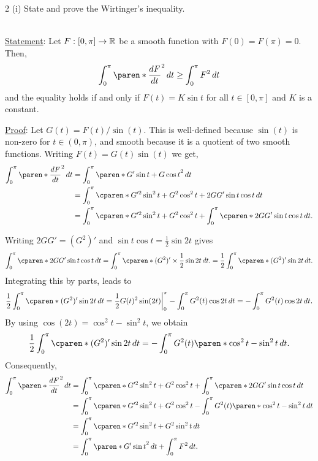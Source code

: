 \documentclass[11pt]{penrose}
\begin{document}
\begin{problem}{2 (i)}
    State and prove the Wirtinger's inequality.

    \solution\\
    \underline{Statement}: Let $F : [0, \pi] \to \mathbb{R}$ be a smooth function with $F(0) = F(\pi) = 0$. Then,
        \begin{equation*}
            \int_{0}^{\pi} \paren*{\frac{dF}{dt}}^2 \,dt \geq \int_{0}^{\pi} F^2 \,dt
        \end{equation*}
        and the equality holds if and only if $F(t) = K \sin t$ for all $t \in [0, \pi]$ and $K$ is a constant.
    
    \underline{Proof}: Let $G(t) = F(t) / \sin(t)$. This is well-defined because $\sin(t)$ is non-zero for $t \in (0, \pi)$, and smooth because it is a quotient of two smooth functions. Writing $F(t) = G(t) \sin(t)$ we get,
    \begin{align*}
        \int_{0}^{\pi} \paren*{\frac{dF}{dt}}^2 \,dt
        &= \int_{0}^{\pi} \paren*{ G' \sin t + G \cos t }^2 \,dt\\
        &= \int_{0}^{\pi} \cparen*{G'^2 \sin^2 t + G^2 \cos^2 t + 2 G G' \sin t \cos t} \,dt\\
        &= \int_{0}^{\pi} \cparen*{G'^2 \sin^2 t + G^2 \cos^2 t} + \int_{0}^{\pi} \cparen*{2 G G' \sin t \cos t} \,dt.
    \end{align*}

    Writing $2 G G' = (G^2)'$ and $\sin t \cos t = \frac{1}{2} \sin 2t$ gives
    \begin{equation*}
        \int_{0}^{\pi} \cparen*{2 G G' \sin t \cos t} \,dt
        = \int_{0}^{\pi} \cparen*{(G^2)' \times \frac{1}{2} \sin 2t} \,dt.
        = \frac{1}{2} \int_{0}^{\pi} \cparen*{(G^2)' \sin 2t} \,dt.
    \end{equation*}
    Integrating this by parts, leads to
    \begin{equation*}
        \frac{1}{2} \int_{0}^{\pi} \cparen*{(G^2)' \sin 2t} \,dt
        = \bigg. \frac{1}{2} G(t)^2  \sin (2t) \bigg|_{0}^{\pi} - \int_{0}^{\pi} G^2(t) \cos 2t \,dt
        = - \int_{0}^{\pi} G^2(t) \cos 2t \,dt.
    \end{equation*}
    By using $\cos(2t) = \cos^2 t - \sin^2 t$, we obtain
    \begin{equation*}
        \frac{1}{2} \int_{0}^{\pi} \cparen*{(G^2)' \sin 2t} \,dt
        = -\int_{0}^{\pi} G^2(t) \paren*{\cos^2 t - \sin^2 t} \,dt.
    \end{equation*}
    Consequently,
    \begin{align*}
        \int_{0}^{\pi} \paren*{\frac{dF}{dt}}^2 \,dt
        &= \int_{0}^{\pi} \cparen*{G'^2 \sin^2 t + G^2 \cos^2 t} + \int_{0}^{\pi} \cparen*{2 G G' \sin t \cos t} \,dt\\
        &= \int_{0}^{\pi} \cparen*{G'^2 \sin^2 t + G^2 \cos^2 t} - \int_{0}^{\pi} G^2(t) \paren*{\cos^2 t - \sin^2 t} \,dt\\
        &= \int_{0}^{\pi} \cparen*{G'^2 \sin^2 t + G^2 \sin^2 t} \,dt\\
        &= \int_{0}^{\pi} \paren*{G' \sin t}^2 \,dt + \int_{0}^{\pi} F^2 \,dt.
    \end{align*}


\end{problem}
\end{document}

